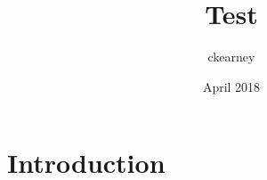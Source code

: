 \documentclass{article}
\title{Test}
\author{ckearney }
\date{April 2018}
\begin{document}
\maketitle

\section{Introduction}
\end{document}
